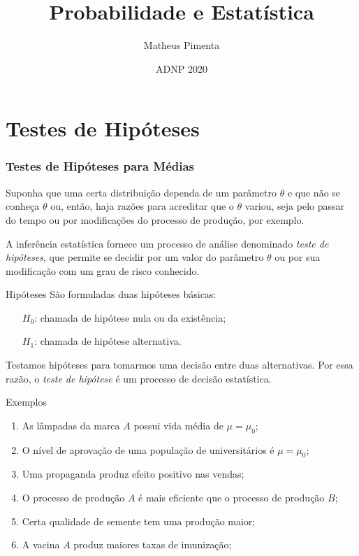 \documentclass[hyperref={pdfpagelabels=false}]{beamer}
\title{Probabilidade e Estatística}
\author[Matheus Pimenta]{Matheus Pimenta}
\institute[UTFPR-CP]{\normalsize Universidade Tecnológica Federal do Paraná \\
	Câmpus Cornélio Procópio
}
\date{ADNP 2020}
\begin{document}
	
\begin{frame}
\titlepage
\end{frame} 




\section{Testes de Hipóteses} 

\begin{frame}
\frametitle{Testes de Hipóteses para Médias}
Suponha que uma certa distribuição dependa de um parâmetro $\theta$ e que não se conheça $\theta$ ou, então, haja razões para acreditar que o $\theta$ variou, seja pelo passar do tempo ou por modificações do processo de produção, por exemplo.

\pause

A inferência estatística fornece um processo de análise denominado \emph{teste de hipóteses}, que permite se decidir por um valor do parâmetro $\theta$ ou por sua modificação com um grau de risco conhecido.

\end{frame}

\begin{frame}{Hipóteses}
São formuladas duas hipóteses básicas:
\begin{itemize}
	\item [$H_0$:] chamada de hipótese nula ou da existência;
	\item [$H_1$:] chamada de hipótese alternativa.
\end{itemize}

\pause

Testamos hipóteses para tomarmos uma decisão entre duas alternativas. Por essa razão, o \emph{teste de hipótese} é um processo de decisão estatística.

\end{frame}

\begin{frame}{Exemplos}
\begin{enumerate}
	\item As lâmpadas da marca $A$ possui vida média de $\mu = \mu_0$; \pause
	\item O nível de aprovação de uma população de universitários é $\mu = \mu_0$; \pause
	\item Uma propaganda produz efeito positivo nas vendas; \pause
	\item O processo de produção $A$ é mais eficiente que o processo de produção $B$; \pause
	\item Certa qualidade de semente tem uma produção maior; \pause
	\item A vacina $A$ produz maiores taxas de imunização;
\end{enumerate}
\end{frame}
\end{document}
